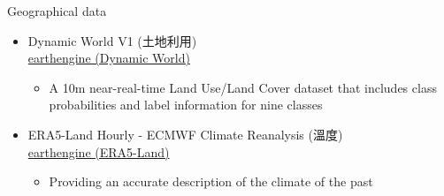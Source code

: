 \documentclass[hyperref={pdfpagelabels=false}]{beamer}
\begin{document}
\begin{frame}{Geographical data}
	\begin{itemize} 
		\item Dynamic World V1 (土地利用) \\ \href{https://developers.google.com/earth-engine/datasets/catalog/GOOGLE_DYNAMICWORLD_V1}{earthengine (Dynamic World)}  
		\vspace{0.2cm}
		\begin{itemize} 
			\vspace{0.2cm}
			\item A 10m near-real-time Land Use/Land Cover dataset that includes class probabilities and label information for nine classes 
		\end{itemize}
		\vspace{0.2cm}
		\item ERA5-Land Hourly - ECMWF Climate Reanalysis (溫度) \\ \href{https://developers.google.com/earth-engine/datasets/catalog/ECMWF_ERA5_LAND_HOURLY}{earthengine (ERA5-Land)}  
		\vspace{0.2cm}
		\begin{itemize} 
			\vspace{0.2cm}
			\item Providing an accurate description of the climate of the past
		\end{itemize}
		\vspace{0.2cm}
		
		
	\end{itemize}
\end{frame}
\end{document}
